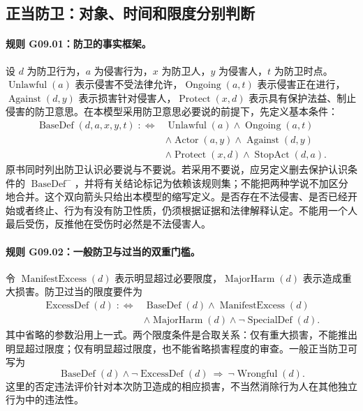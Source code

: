 \subsection{正当防卫：对象、时间和限度分别判断}
\paragraph{规则 G09.01：防卫的事实框架。}
设 $d$ 为防卫行为，$a$ 为侵害行为，$x$ 为防卫人，$y$ 为侵害人，$t$ 为防卫时点。$\operatorname{Unlawful}(a)$ 表示侵害不受法律允许，$\operatorname{Ongoing}(a,t)$ 表示侵害正在进行，$\operatorname{Against}(d,y)$ 表示损害针对侵害人，$\operatorname{Protect}(x,d)$ 表示具有保护法益、制止侵害的防卫意思。在本模型采用防卫意思必要说的前提下，先定义基本条件：
\[
\begin{aligned}
\operatorname{BaseDef}(d,a,x,y,t)\;:\!\!\iff{}&
\operatorname{Unlawful}(a)\land\operatorname{Ongoing}(a,t)\\
&\land\operatorname{Actor}(a,y)\land\operatorname{Against}(d,y)\\
&\land\operatorname{Protect}(x,d)\land\operatorname{StopAct}(d,a).
\end{aligned}
\]
原书同时列出防卫认识必要说与不要说。若采用不要说，应另定义删去保护认识条件的 $\operatorname{BaseDef}^{-}$，并将有关结论标记为依赖该规则集；不能把两种学说不加区分地合并。这个双向箭头只给出本模型的缩写定义。是否存在不法侵害、是否已经开始或者终止、行为有没有防卫性质，仍须根据证据和法律解释认定。不能用一个人最后受伤，反推他在受伤时必然是不法侵害人。

\paragraph{规则 G09.02：一般防卫与过当的双重门槛。}
令 $\operatorname{ManifestExcess}(d)$ 表示明显超过必要限度，$\operatorname{MajorHarm}(d)$ 表示造成重大损害。防卫过当的限度要件为
\[
\begin{aligned}
\operatorname{ExcessDef}(d)\;:\!\!\iff{}&
\operatorname{BaseDef}(d)\land\operatorname{ManifestExcess}(d)\\
&\land\operatorname{MajorHarm}(d)\land\neg\operatorname{SpecialDef}(d).
\end{aligned}
\]
其中省略的参数沿用上一式。两个限度条件是合取关系：仅有重大损害，不能推出明显超过限度；仅有明显超过限度，也不能省略损害程度的审查。一般正当防卫可写为
\[
\operatorname{BaseDef}(d)\land\neg\operatorname{ExcessDef}(d)
\ \Longrightarrow\ \neg\operatorname{Wrongful}(d).
\]
这里的否定违法评价针对本次防卫造成的相应损害，不当然消除行为人在其他独立行为中的违法性。

